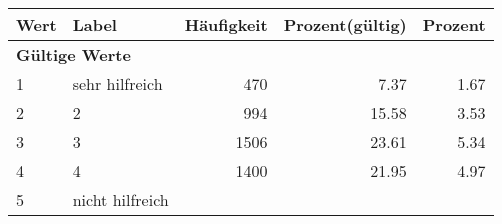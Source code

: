      \begin{longtable}{lXrrr}
     \toprule
     \textbf{Wert} & \textbf{Label} & \textbf{Häufigkeit} & \textbf{Prozent(gültig)} & \textbf{Prozent} \\
     \endhead
     \midrule
     \multicolumn{5}{l}{\textbf{Gültige Werte}}\\

     1 &
     \multicolumn{1}{X}{ sehr hilfreich   } &


       \num{470} &
       \num[round-mode=places,round-precision=2]{7,37} &
         \num[round-mode=places,round-precision=2]{1,67} \\

     2 &
     \multicolumn{1}{X}{ 2   } &


       \num{994} &
       \num[round-mode=places,round-precision=2]{15,58} &
         \num[round-mode=places,round-precision=2]{3,53} \\

     3 &
     \multicolumn{1}{X}{ 3   } &


       \num{1506} &
       \num[round-mode=places,round-precision=2]{23,61} &
         \num[round-mode=places,round-precision=2]{5,34} \\

     4 &
     \multicolumn{1}{X}{ 4   } &


       \num{1400} &
       \num[round-mode=places,round-precision=2]{21,95} &
         \num[round-mode=places,round-precision=2]{4,97} \\

     5 &
     \multicolumn{1}{X}{ nicht hilfreich   } &



\end{longtable}
